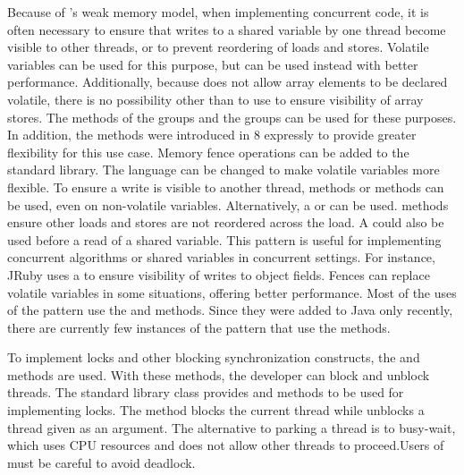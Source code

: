 %
{Because of \java{}'s weak memory
  model, when implementing concurrent code,
  it is often necessary to ensure that
  writes to a shared variable by one thread become visible to other threads,
  or to prevent
  reordering of loads and stores.
  Volatile variables can be used for this purpose, but
  \smu{} can be used instead with better performance.
  Additionally, because \java{} does not allow array elements to be declared volatile,
  there is no possibility other than to use \unsafe{} to ensure visibility of
  array stores. The methods of the  groups
  and the  groups can be used for these purposes.
  In addition, the  methods were introduced in \java{} 8 expressly
to provide greater flexibility for this use case.}
{Memory fence operations can be added to the standard library. The language
can be changed to make volatile variables more flexible.}
{To ensure a write is visible to another thread, 
  methods or  methods can be used, even on non-volatile variables.
  Alternatively, a  or  can be used.
   methods ensure other loads and stores are not reordered
  across the load. A  could also be used before a read of a
  shared variable.
}{This pattern is useful for implementing concurrent algorithms or shared
  variables in concurrent settings. For instance, JRuby uses a 
  to ensure visibility of writes to object fields.
}{Fences can replace volatile variables in some situations, offering better
  performance. Most of the uses of the pattern use the 
  and  methods. Since they were added to Java only recently, there are currently few instances
of the pattern that use the  methods.}

\newcommand\foundinpark{62}
\newcommand\usedbypark{7330}
\newcommand\mostusedpark{\parkmost}
\newcommand\memberspark{\member{park}, \member{unpark}}
\newcommand\namepark{Park/Unpark Threads}


%
{
To implement locks and other blocking synchronization constructs,
the  and  methods are used.
With these methods, the developer can block and unblock threads.
}
{The standard library class  provides  and 
methods to be used for implementing locks.}
{The  method blocks the current thread while 
unblocks a thread given as an argument.}
{The alternative to parking a thread is to busy-wait, which uses CPU
resources and does not allow other threads to proceed.}{Users of
   must be careful to avoid deadlock.}

